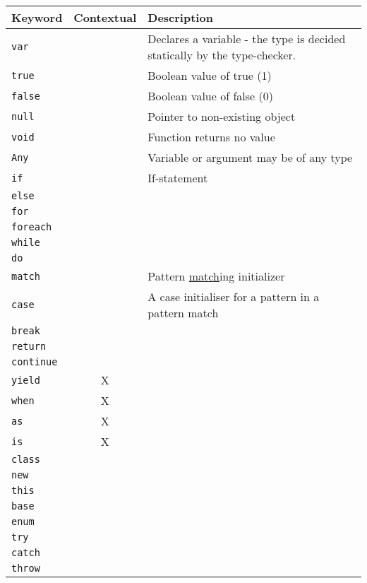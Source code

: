 \documentclass{article}
\begin{document}
\begin{table}[H]
	\centering
	\label{sec:Keywords}
	\begin{tabular}{|l|c|p{}|}
	\hline
	Keyword & Contextual & Description \\ \hline
	\texttt{var} & & Declares a variable - the type is decided statically by the type-checker. \\ \hline
	\texttt{true} & & Boolean value of true (1) \\ \hline
	\texttt{false} & & Boolean value of false (0) \\ \hline
	\texttt{null} & & Pointer to non-existing object \\ \hline
	\texttt{void} & & Function returns no value  \\ \hline
	\texttt{Any} & & Variable or argument may be of any type \\ \hline
	\texttt{if} & & If-statement \\ \hline
	\texttt{else} & & \\ \hline
	\texttt{for} & & \\ \hline
	\texttt{foreach} & & \\ \hline
	\texttt{while} & & \\ \hline
	\texttt{do} & & \\ \hline
	\texttt{match} & & Pattern \underline{match}ing initializer \\ \hline
	\texttt{case} & & A case initialiser for a pattern in a pattern match \\ \hline
	\texttt{break} & & \\ \hline
	\texttt{return} & &  \\ \hline
	\texttt{continue} & & \\ \hline
	\texttt{yield} & X & \\ \hline
	\texttt{when} & X & \\ \hline
	\texttt{as} & X & \\ \hline
	\texttt{is} & X & \\ \hline
	\texttt{class} & & \\ \hline
	\texttt{new} & & \\ \hline
	\texttt{this} & & \\ \hline
	\texttt{base} & & \\ \hline
	\texttt{enum} & & \\ \hline
	\texttt{try} & & \\ \hline
	\texttt{catch} & & \\ \hline
	\texttt{throw} & & \\ \hline

\end{tabular}
\end{table}
\end{document}
